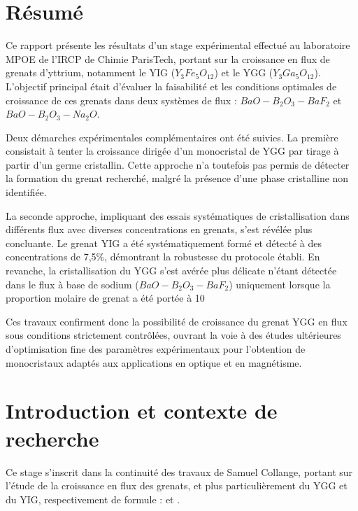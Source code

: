 \documentclass{rapportENSCP}
\begin{document}
\section{Résumé}
Ce rapport présente les résultats d’un stage expérimental effectué au laboratoire MPOE de l'IRCP de Chimie ParisTech, portant sur la croissance en flux de grenats d’yttrium, notamment le YIG ($Y_3Fe_5O_{12}$) et le YGG ($Y_3Ga_5O_{12}$). L’objectif principal était d’évaluer la faisabilité et les conditions optimales de croissance de ces grenats dans deux systèmes de flux : $BaO-B_2O_3-BaF_2$ et $BaO-B_2O_3-Na_2O$.

Deux démarches expérimentales complémentaires ont été suivies. La première consistait à tenter la croissance dirigée d’un monocristal de YGG par tirage à partir d’un germe cristallin. Cette approche n’a toutefois pas permis de détecter la formation du grenat recherché, malgré la présence d'une phase cristalline non identifiée.

La seconde approche, impliquant des essais systématiques de cristallisation dans différents flux avec diverses concentrations en grenats, s’est révélée plus concluante. Le grenat YIG a été systématiquement formé et détecté à des concentrations de 7,5\%, démontrant la robustesse du protocole établi. En revanche, la cristallisation du YGG s’est avérée plus délicate n’étant détectée  dans le flux à base de sodium ($BaO-B_2O_3-BaF_2$) uniquement lorsque la proportion molaire de grenat a été portée à 10%

Ces travaux confirment donc la possibilité de croissance du grenat YGG en flux sous conditions strictement contrôlées, ouvrant la voie à des études ultérieures d’optimisation fine des paramètres expérimentaux pour l’obtention de monocristaux adaptés aux applications en optique et en magnétisme.

\section{Introduction et contexte de recherche}
Ce stage s'inscrit dans la continuité des travaux de Samuel Collange, portant sur l'étude de la croissance en flux des grenats, et plus particulièrement du YGG et du YIG, respectivement de formule : \YGG et \YIG.
\end{document}

